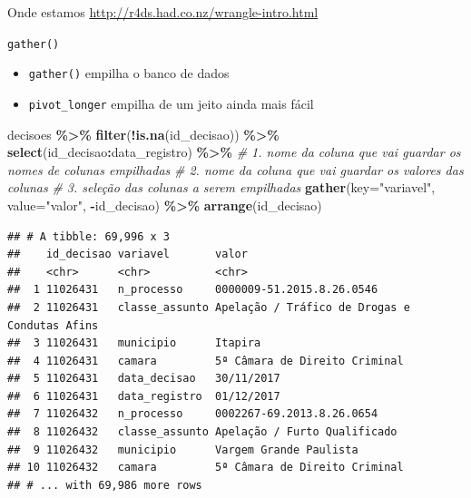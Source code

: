\documentclass[
  10pt,
  ignorenonframetext,
]{beamer}
\newenvironment{Shaded}{\begin{snugshade}}{\end{snugshade}}
\newcommand{\CommentTok}[1]{\textcolor[rgb]{0.56,0.35,0.01}{\textit{#1}}}
\newcommand{\DataTypeTok}[1]{\textcolor[rgb]{0.13,0.29,0.53}{#1}}
\newcommand{\KeywordTok}[1]{\textcolor[rgb]{0.13,0.29,0.53}{\textbf{#1}}}
\newcommand{\NormalTok}[1]{#1}
\newcommand{\OperatorTok}[1]{\textcolor[rgb]{0.81,0.36,0.00}{\textbf{#1}}}
\newcommand{\StringTok}[1]{\textcolor[rgb]{0.31,0.60,0.02}{#1}}
\begin{document}
\begin{frame}{Onde estamos}
\protect\hypertarget{onde-estamos}{}
\url{http://r4ds.had.co.nz/wrangle-intro.html}
\end{frame}

\begin{frame}[fragile]{\texttt{gather()}}
\protect\hypertarget{gather}{}
\begin{itemize}
\item
  \texttt{gather()} empilha o banco de dados
\item
  \texttt{pivot\_longer} empilha de um jeito ainda mais fácil
\end{itemize}

\begin{Shaded}
\begin{Highlighting}[]
\NormalTok{decisoes }\OperatorTok{\%\textgreater{}\%}\StringTok{ }
\StringTok{  }\KeywordTok{filter}\NormalTok{(}\OperatorTok{!}\KeywordTok{is.na}\NormalTok{(id\_decisao)) }\OperatorTok{\%\textgreater{}\%}\StringTok{ }
\StringTok{  }\KeywordTok{select}\NormalTok{(id\_decisao}\OperatorTok{:}\NormalTok{data\_registro) }\OperatorTok{\%\textgreater{}\%}\StringTok{ }
\StringTok{  }\CommentTok{\# 1. nome da coluna que vai guardar os nomes de colunas empilhadas}
\StringTok{  }\CommentTok{\# 2. nome da coluna que vai guardar os valores das colunas}
\StringTok{  }\CommentTok{\# 3. seleção das colunas a serem empilhadas}
\StringTok{  }\KeywordTok{gather}\NormalTok{(}\DataTypeTok{key=}\StringTok{"variavel"}\NormalTok{, }\DataTypeTok{value=}\StringTok{"valor"}\NormalTok{, }\OperatorTok{{-}}\NormalTok{id\_decisao) }\OperatorTok{\%\textgreater{}\%}\StringTok{ }
\StringTok{  }\KeywordTok{arrange}\NormalTok{(id\_decisao)}
\end{Highlighting}
\end{Shaded}

\begin{verbatim}
## # A tibble: 69,996 x 3
##    id_decisao variavel       valor                                        
##    <chr>      <chr>          <chr>                                        
##  1 11026431   n_processo     0000009-51.2015.8.26.0546                    
##  2 11026431   classe_assunto Apelação / Tráfico de Drogas e Condutas Afins
##  3 11026431   municipio      Itapira                                      
##  4 11026431   camara         5ª Câmara de Direito Criminal                
##  5 11026431   data_decisao   30/11/2017                                   
##  6 11026431   data_registro  01/12/2017                                   
##  7 11026432   n_processo     0002267-69.2013.8.26.0654                    
##  8 11026432   classe_assunto Apelação / Furto Qualificado                 
##  9 11026432   municipio      Vargem Grande Paulista                       
## 10 11026432   camara         5ª Câmara de Direito Criminal                
## # ... with 69,986 more rows
\end{verbatim}
\end{frame}
\end{document}
